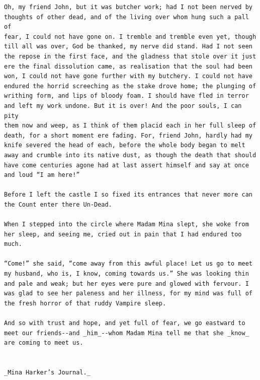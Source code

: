 \documentclass{article}
\begin{document}
\begin{verbatim}
Oh, my friend John, but it was butcher work; had I not been nerved by
thoughts of other dead, and of the living over whom hung such a pall of
fear, I could not have gone on. I tremble and tremble even yet, though
till all was over, God be thanked, my nerve did stand. Had I not seen
the repose in the first face, and the gladness that stole over it just
ere the final dissolution came, as realisation that the soul had been
won, I could not have gone further with my butchery. I could not have
endured the horrid screeching as the stake drove home; the plunging of
writhing form, and lips of bloody foam. I should have fled in terror
and left my work undone. But it is over! And the poor souls, I can pity
them now and weep, as I think of them placid each in her full sleep of
death, for a short moment ere fading. For, friend John, hardly had my
knife severed the head of each, before the whole body began to melt
away and crumble into its native dust, as though the death that should
have come centuries agone had at last assert himself and say at once
and loud “I am here!”

Before I left the castle I so fixed its entrances that never more can
the Count enter there Un-Dead.

When I stepped into the circle where Madam Mina slept, she woke from
her sleep, and seeing me, cried out in pain that I had endured too much.

“Come!” she said, “come away from this awful place! Let us go to meet
my husband, who is, I know, coming towards us.” She was looking thin
and pale and weak; but her eyes were pure and glowed with fervour. I
was glad to see her paleness and her illness, for my mind was full of
the fresh horror of that ruddy Vampire sleep.

And so with trust and hope, and yet full of fear, we go eastward to
meet our friends--and _him_--whom Madam Mina tell me that she _know_
are coming to meet us.


_Mina Harker’s Journal._


\end{verbatim}
\end{document}
